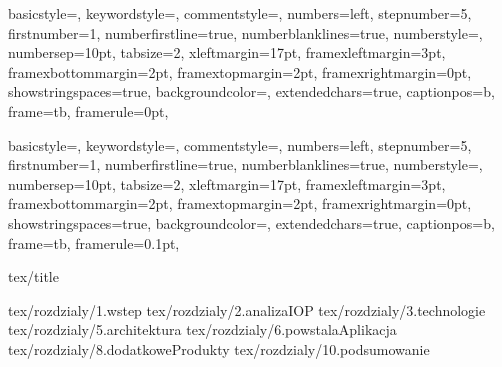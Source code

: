 \documentclass[a4paper,onecolumn,oneside,11pt,wide,floatssmall]{mwrep}
\theoremstyle{definition}
\theoremstyle{plain}%
\theoremstyle{remark}
\begin{document}
{
basicstyle={\footnotesize},
keywordstyle={\bf\footnotesize\color{blue}},
commentstyle={\em\footnotesize\color{magenta}},
numbers=left,
stepnumber=5,
firstnumber=1,
numberfirstline=true,
numberblanklines=true,
numberstyle={\sf\tiny},
numbersep=10pt,
tabsize=2,
xleftmargin=17pt,
framexleftmargin=3pt,
framexbottommargin=2pt,
framextopmargin=2pt,
framexrightmargin=0pt,
showstringspaces=true,
backgroundcolor={\color{ListingBackground}},
extendedchars=true,
captionpos=b,
frame=tb,
framerule=0pt,
}

{
basicstyle={\footnotesize},
keywordstyle={\bf\footnotesize\color{blue}},
commentstyle={\em\footnotesize\color{magenta}},
numbers=left,
stepnumber=5,
firstnumber=1,
numberfirstline=true,
numberblanklines=true,
numberstyle={\sf\tiny},
numbersep=10pt,
tabsize=2,
xleftmargin=17pt,
framexleftmargin=3pt,
framexbottommargin=2pt,
framextopmargin=2pt,
framexrightmargin=0pt,
showstringspaces=true,
backgroundcolor={\color{ListingBackground}},
extendedchars=true,
captionpos=b,
frame=tb,
framerule=0.1pt,
}

\renewcommand*\lstlistingname{Wydruk}
\renewcommand*\lstlistlistingname{Spis wydruków}

\renewcommand{\baselinestretch}{1.0}
\raggedbottom
 {tex/title}

\tableofcontents


\newpage
{}
\setcounter{page}{5}

 {tex/rozdzialy/1.wstep}
 {tex/rozdzialy/2.analizaIOP}
 {tex/rozdzialy/3.technologie}
 {tex/rozdzialy/5.architektura}
 {tex/rozdzialy/6.powstalaAplikacja}
 {tex/rozdzialy/8.dodatkoweProdukty}
 {tex/rozdzialy/10.podsumowanie}

\appendix


\nocite{*}


% 

\end{document}
